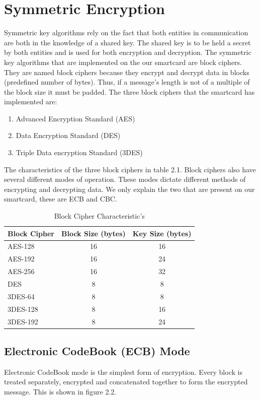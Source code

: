 \documentclass[bsc,frontabs,twoside,singlespacing,parskip,deptreport]{infthesis}     %
\begin{document}
\section{Symmetric Encryption}
Symmetric key algorithms rely on the fact that both entities in communication are both in the knowledge of a shared key. The shared key is to be held a secret by both entities and is used for both encryption and decryption. The symmetric key algorithms that are implemented on the our smartcard are block ciphers. They are named block ciphers because they encrypt and decrypt data in blocks (predefined number of bytes). Thus, if a message's length is not of a multiple of the block size it must be padded. The three block ciphers that the smartcard has implemented are:
\begin{enumerate}
\item Advanced Encryption Standard (AES)
\item Data Encryption Standard (DES)
\item Triple Data encryption Standard (3DES)\\
\end{enumerate}

The characteristics of the three block ciphers in table 2.1. Block ciphers also have several different modes of operation. These modes dictate different methods of encrypting and decrypting data. We only explain the two that are present on our smartcard, these are ECB and CBC.

\begin{table}[H]
\begin{tabular}{|l|c|c|}
\hline
Block Cipher & Block Size (bytes) & Key Size (bytes)\\
\hline
AES-128 & 16 & 16\\
AES-192 & 16 & 24\\
AES-256 & 16 & 32\\
\hline
DES & 8 & 8\\
\hline
3DES-64 & 8 & 8\\
3DES-128 & 8 & 16\\
3DES-192 & 8 & 24\\
\hline
\end{tabular}
\caption{Block Cipher Characteristic's}
\end{table}

\subsection{Electronic CodeBook (ECB) Mode}
Electronic CodeBook mode is the simplest form of encryption. Every block is treated separately, encrypted and concatenated together to form the encrypted message. This is shown in figure 2.2.
\end{document}
